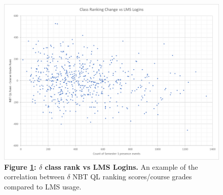 \begin{figure}[H]
    \centering
    \includegraphics[scale=0.6]{./resources/figures/delta-class-rank.png}
    \caption[\( \delta \) class rank vs LMS Logins]{\textbf{Figure \ref{fig-delta-rank}: \( \delta \) class rank vs LMS Logins.} An example of the correlation between \( \delta \) NBT QL ranking scores/course grades compared to LMS usage.}
    \label{fig-delta-rank}
\end{figure}
